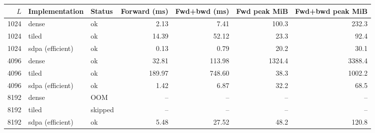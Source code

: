 \scriptsize
\setlength{\tabcolsep}{3.5pt}
\label{tab:t2atime}
\begin{adjustbox}{max width=\linewidth}
\begin{tabular}{rllrrrr}
\toprule
$L$ & Implementation & Status & Forward (ms) & Fwd+bwd (ms) & Fwd peak MiB & Fwd+bwd peak MiB \\
\midrule
1024 & dense & ok & 2.13 & 7.41 & 100.3 & 232.3 \\
1024 & tiled & ok & 14.39 & 52.12 & 23.3 & 92.4 \\
1024 & sdpa (efficient) & ok & 0.13 & 0.79 & 20.2 & 30.1 \\
4096 & dense & ok & 32.81 & 113.98 & 1324.4 & 3388.4 \\
4096 & tiled & ok & 189.97 & 748.60 & 38.3 & 1002.2 \\
4096 & sdpa (efficient) & ok & 1.42 & 6.87 & 32.2 & 68.5 \\
8192 & dense & OOM & -- & -- & -- & -- \\
8192 & tiled & skipped & -- & -- & -- & -- \\
8192 & sdpa (efficient) & ok & 5.48 & 27.52 & 48.2 & 120.8 \\
\bottomrule
\end{tabular}
\end{adjustbox}
